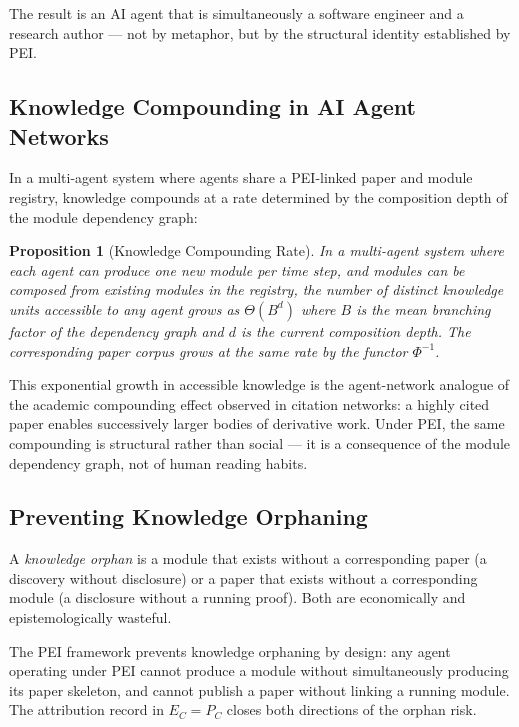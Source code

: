 \documentclass[12pt]{article}
\newtheorem{proposition}[theorem]{Proposition}
\begin{document}
The result is an AI agent that is simultaneously a software engineer and a
research author — not by metaphor, but by the structural identity established
by PEI.

\subsection{Knowledge Compounding in AI Agent Networks}

In a multi-agent system where agents share a PEI-linked paper and module
registry, knowledge compounds at a rate determined by the composition depth
of the module dependency graph:

\begin{proposition}[Knowledge Compounding Rate]
  In a multi-agent system where each agent can produce one new module per time
  step, and modules can be composed from existing modules in the registry, the
  number of distinct knowledge units accessible to any agent grows as
  $\Theta(B^d)$ where $B$ is the mean branching factor of the dependency graph
  and $d$ is the current composition depth.  The corresponding paper corpus
  grows at the same rate by the functor $\Phi^{-1}$.
\end{proposition}

This exponential growth in accessible knowledge is the agent-network analogue
of the academic compounding effect observed in citation networks: a highly
cited paper enables successively larger bodies of derivative work.  Under PEI,
the same compounding is structural rather than social — it is a consequence of
the module dependency graph, not of human reading habits.

\subsection{Preventing Knowledge Orphaning}

A \emph{knowledge orphan} is a module that exists without a corresponding paper
(a discovery without disclosure) or a paper that exists without a corresponding
module (a disclosure without a running proof).  Both are economically and
epistemologically wasteful.

The PEI framework prevents knowledge orphaning by design: any agent operating
under PEI cannot produce a module without simultaneously producing its paper
skeleton, and cannot publish a paper without linking a running module.  The
attribution record in $E_C = P_C$ closes both directions of the orphan risk.
\end{document}
